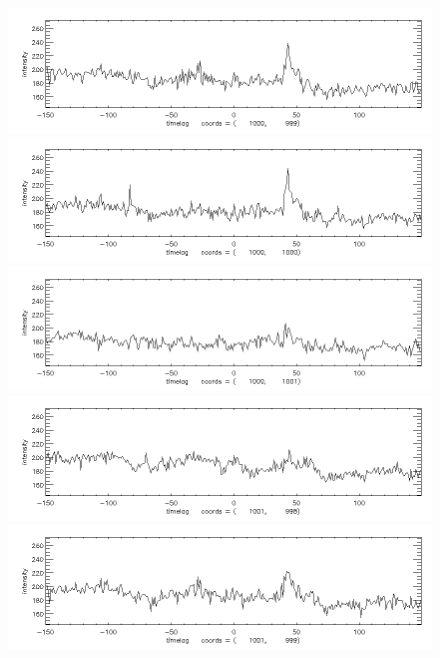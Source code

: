 \documentclass[12pt]{article}
\begin{document}
\begin{figure}[here]
\includegraphics[width=7in]{lc16.png}
\includegraphics[width=7in]{lc17.png}
\includegraphics[width=7in]{lc18.png}
\includegraphics[width=7in]{lc19.png}
\includegraphics[width=7in]{lc20.png}
\end{figure}
\newpage
\end{document}
